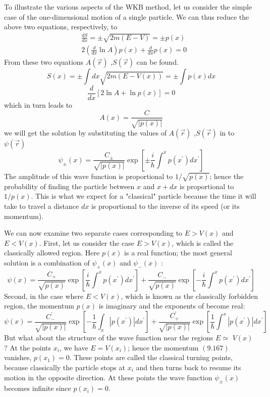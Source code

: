 To illustrate the various aspects of the WKB method, let us consider the simple case of the one-dimensional motion of a single particle. We can thus reduce the above two equations, respectively, to
$$
\begin{aligned}
&\frac{d S}{d x}=\pm \sqrt{2 m(E-V)}=\pm p(x) \\
&2\left(\frac{d}{d x} \ln A\right) p(x)+\frac{d}{d x} p(x)=0
\end{aligned}
$$
From these two equations $A(\vec{r})$ ,$S(\vec{r})$ can be found.
$$S(x)=\pm \int d x \sqrt{2 m(E-V(x))}=\pm \int p(x) d x$$
$$
\frac{d}{d x}[2 \ln A+\ln p(x)]=0
$$
which in turn leads to
$$
A(x)=\frac{C}{\sqrt{|p(x)|}}
$$
we will get the solution by substituting the values of $A(\vec{r})$ ,$S(\vec{r})$ in to 
$\psi(\vec{r})$\\
$$\psi_{\pm}(x)=\frac{C_{\pm}}{\sqrt{|p(x)|}} \exp \left[\pm \frac{i}{\hbar} \int^{x} p\left(x^{\prime}\right) d x^{\prime}\right] $$
The amplitude of this wave function is proportional to $1 / \sqrt{p(x)}$; hence the probability of finding the particle between $x$ and $x+d x$ is proportional to $1 / p(x)$. This is what we expect for a "classical" particle because the time it will take to travel a distance $d x$ is proportional to the inverse of its speed (or its momentum).
\par We can now examine two separate cases corresponding to $E>V(x)$ and $E<V(x)$. First, let us consider the case $E>V(x)$, which is called the classically allowed region. Here $p(x)$ is a real function; the most general solution  is a combination of $\psi_{+}(x)$ and $\psi_{-}(x)$ :
$$
\psi(x)=\frac{C_{+}}{\sqrt{p(x)}} \exp \left[\frac{i}{\hbar} \int^{x} p\left(x^{\prime}\right) d x^{\prime}\right]+\frac{C_{-}}{\sqrt{p(x)}} \exp \left[-\frac{i}{\hbar} \int^{x} p\left(x^{\prime}\right) d x^{\prime}\right]
$$
Second, in the case where $E<V(x)$, which is known as the classically forbidden region, the momentum $p(x)$ is imaginary and the exponents of become real:
$$
\psi(x)=\frac{C_{-}^{\prime}}{\sqrt{|p(x)|}} \exp \left[-\frac{1}{\hbar} \int_{x}\left|p\left(x^{\prime}\right)\right| d x^{\prime}\right]+\frac{C_{+}^{\prime}}{\sqrt{|p(x)|}} \exp \left[\frac{1}{\hbar} \int^{x}\left|p\left(x^{\prime}\right)\right| d x^{\prime}\right]
$$
But what about the structure of the wave function near the regions $E \simeq$ $V(x)$ ? At the points $x_{i}$, we have $E=V\left(x_{i}\right)$; hence the momentum $(9.167)$ vanishes, $p\left(x_{1}\right)=0$. These points are called the classical turning points, because classically the particle stops at $x_{i}$ and then turns back to resume its motion in the opposite direction. At these points the wave function $\psi_{\pm}(x)$ becomes infinite since $p\left(x_{i}\right)=0$. 

